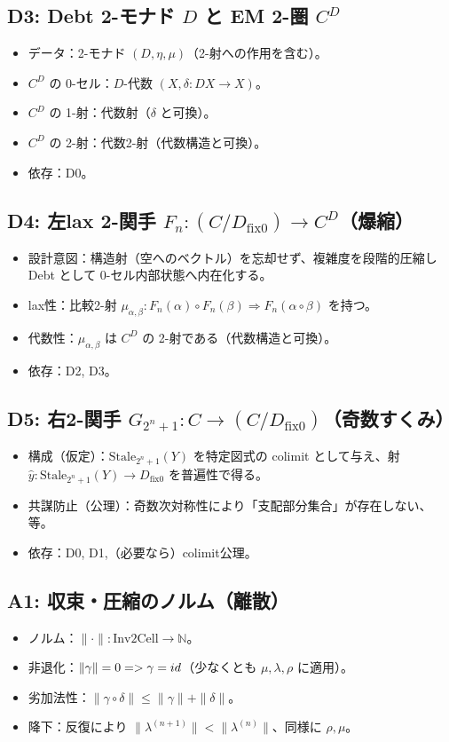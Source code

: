 \documentclass[a4paper,11pt]{article}
\begin{document}
\subsection*{D3: Debt 2-モナド $D$ と EM 2-圏 $C^D$}
\begin{itemize}
  \item データ：2-モナド $(D,\eta,\mu)$（2-射への作用を含む）。
  \item $C^D$ の 0-セル：$D$-代数 $(X,\delta:DX\to X)$。
  \item $C^D$ の 1-射：代数射（$\delta$ と可換）。
  \item $C^D$ の 2-射：代数2-射（代数構造と可換）。
  \item 依存：D0。
\end{itemize}

\subsection*{D4: 左lax 2-関手 $F_n:(C/D_{\mathrm{fix}0})\to C^D$（爆縮）}
\begin{itemize}
  \item 設計意図：構造射（空へのベクトル）を忘却せず、複雑度を段階的圧縮し Debt として 0-セル内部状態へ内在化する。
  \item lax性：比較2-射 $\mu_{\alpha,\beta}:F_n(\alpha)\circ F_n(\beta)\Rightarrow F_n(\alpha\circ\beta)$ を持つ。
  \item 代数性：$\mu_{\alpha,\beta}$ は $C^D$ の 2-射である（代数構造と可換）。
  \item 依存：D2, D3。
\end{itemize}

\subsection*{D5: 右2-関手 $G_{2^n+1}:C\to (C/D_{\mathrm{fix}0})$（奇数すくみ）}
\begin{itemize}
  \item 構成（仮定）：$\mathrm{Stale}_{2^n+1}(Y)$ を特定図式の colimit として与え、射 $\hat y:\mathrm{Stale}_{2^n+1}(Y)\to D_{\mathrm{fix}0}$ を普遍性で得る。
  \item 共謀防止（公理）：奇数次対称性により「支配部分集合」が存在しない、等。
  \item 依存：D0, D1,（必要なら）colimit公理。
\end{itemize}

\subsection*{A1: 収束・圧縮のノルム（離散）}
\begin{itemize}
  \item ノルム：$\|\cdot\|:\mathrm{Inv2Cell}\to\mathbb{N}$。
  \item 非退化：$\|\gamma\|=0=> \gamma=id$（少なくとも $\mu,\lambda,\rho$ に適用）。
  \item 劣加法性：$\|\gamma\circ\delta\|\le \|\gamma\|+\|\delta\|$。
  \item 降下：反復により $\|\lambda^{(n+1)}\|<\|\lambda^{(n)}\|$、同様に $\rho,\mu$。
\end{itemize}
\end{document}
